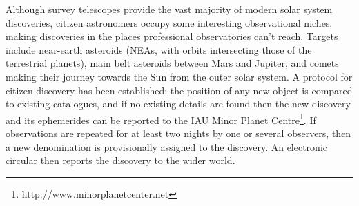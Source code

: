 \documentclass{ar2e}
\begin{document}
% 
% 
% 
%  
% 
% 


% 


Although survey telescopes provide the vast majority of modern solar system
discoveries, citizen astronomers occupy some interesting observational niches,
making discoveries in the places professional observatories can't reach. Targets
include near-earth asteroids (NEAs, with orbits intersecting those of the
terrestrial planets), main belt asteroids between Mars and Jupiter, and comets
making their journey towards the Sun from the outer solar system. A protocol for
citizen discovery has been established: the position of any new object is
compared to existing catalogues, and if no existing details are found then the
new discovery and its ephemerides can be reported to the IAU Minor Planet
Centre\footnote{http://www.minorplanetcenter.net}.   If observations are
repeated for at least two nights by one or several observers, then a new
denomination is provisionally assigned to the discovery.   An electronic
circular then reports the discovery to the wider world.
\end{document}
